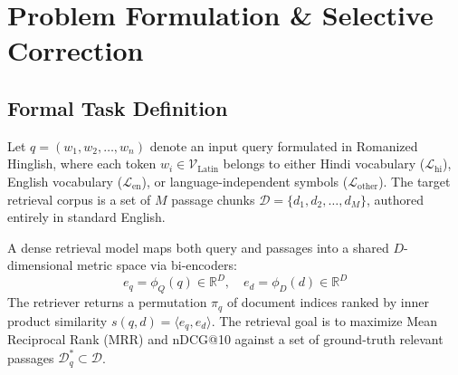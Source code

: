 \documentclass[conference]{IEEEtran}
\begin{document}
\section{Problem Formulation \& Selective Correction}
\label{sec:problem_formulation}

\subsection{Formal Task Definition}
Let $q = (w_1, w_2, \dots, w_n)$ denote an input query formulated in Romanized Hinglish, where each token $w_i \in \mathcal{V}_{\text{Latin}}$ belongs to either Hindi vocabulary ($\mathcal{L}_{\text{hi}}$), English vocabulary ($\mathcal{L}_{\text{en}}$), or language-independent symbols ($\mathcal{L}_{\text{other}}$). The target retrieval corpus is a set of $M$ passage chunks $\mathcal{D} = \{d_1, d_2, \dots, d_M\}$, authored entirely in standard English. 

A dense retrieval model maps both query and passages into a shared $D$-dimensional metric space via bi-encoders:
\begin{equation}
e_q = \phi_Q(q) \in \mathbb{R}^D, \quad e_d = \phi_D(d) \in \mathbb{R}^D
\end{equation}
The retriever returns a permutation $\pi_q$ of document indices ranked by inner product similarity $s(q, d) = \langle e_q, e_d \rangle$. The retrieval goal is to maximize Mean Reciprocal Rank (MRR) and nDCG@10 against a set of ground-truth relevant passages $\mathcal{D}^*_q \subset \mathcal{D}$.
\end{document}
